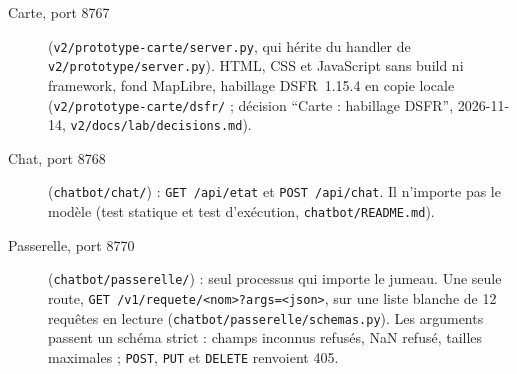 \begin{description}
\item[Carte, port 8767] (\texttt{v2/\allowbreak{}prototype-\allowbreak{}carte/\allowbreak{}server.py}, qui hérite du handler de \texttt{v2/\allowbreak{}prototype/\allowbreak{}server.py}).
HTML, CSS et JavaScript sans build ni framework, fond MapLibre, habillage DSFR~1.15.4 en copie locale (\texttt{v2/\allowbreak{}prototype-\allowbreak{}carte/\allowbreak{}dsfr/\allowbreak{}} ; décision \enquote{Carte : habillage DSFR}, 2026-11-14, \texttt{v2/\allowbreak{}docs/\allowbreak{}lab/\allowbreak{}decisions.md}).
\item[Chat, port 8768] (\texttt{chatbot/\allowbreak{}chat/\allowbreak{}}) : \texttt{GET /\allowbreak{}api/\allowbreak{}etat} et \texttt{POST /\allowbreak{}api/\allowbreak{}chat}. Il n'importe pas le modèle (test statique et test d'exécution, \texttt{chatbot/\allowbreak{}README.md}).
\item[Passerelle, port 8770] (\texttt{chatbot/\allowbreak{}passerelle/\allowbreak{}}) : seul processus qui importe le jumeau. Une seule route, \texttt{GET /\allowbreak{}v1/\allowbreak{}requete/\allowbreak{}<nom>?args=<json>}, sur une liste blanche de 12\mesure{} requêtes en lecture (\texttt{chatbot/\allowbreak{}passerelle/\allowbreak{}schemas.py}). Les arguments passent un schéma strict : champs inconnus refusés, NaN refusé, tailles maximales ; \texttt{POST}, \texttt{PUT} et \texttt{DELETE} renvoient 405.
\end{description}

